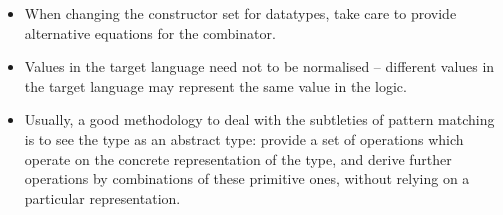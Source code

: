 \begin{isabellebody}
\begin{isamarkuptext}
  \begin{itemize}

    \item When changing the constructor set for datatypes, take care
      to provide alternative equations for the  combinator.

    \item Values in the target language need not to be normalised --
      different values in the target language may represent the same
      value in the logic.

    \item Usually, a good methodology to deal with the subtleties of
      pattern matching is to see the type as an abstract type: provide
      a set of operations which operate on the concrete representation
      of the type, and derive further operations by combinations of
      these primitive ones, without relying on a particular
      representation.


\end{itemize}
\end{isamarkuptext}
\end{isabellebody}
